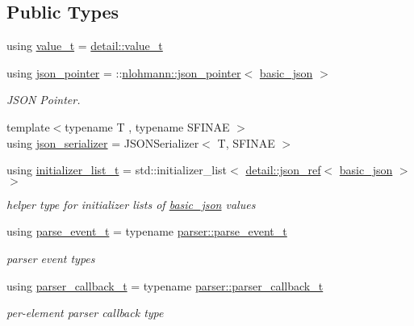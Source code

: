 \subsection*{Public Types}
\begin{DoxyCompactItemize}
\item 
using \hyperlink{classnlohmann_1_1basic__json_ae8cbef097f7da18a781fc86587de6b90}{value\+\_\+t} = \hyperlink{namespacenlohmann_1_1detail_a1ed8fc6239da25abcaf681d30ace4985}{detail\+::value\+\_\+t}
\item 
using \hyperlink{classnlohmann_1_1basic__json_a6886a5001f5b449ad316101a311ce536}{json\+\_\+pointer} = \+::\hyperlink{classnlohmann_1_1json__pointer}{nlohmann\+::json\+\_\+pointer}$<$ \hyperlink{classnlohmann_1_1basic__json}{basic\+\_\+json} $>$
\begin{DoxyCompactList}\small\item\em J\+S\+ON Pointer. \end{DoxyCompactList}\item 
{\footnotesize template$<$typename T , typename S\+F\+I\+N\+AE $>$ }\\using \hyperlink{classnlohmann_1_1basic__json_a7768841baaaa7a21098a401c932efaff}{json\+\_\+serializer} = J\+S\+O\+N\+Serializer$<$ T, S\+F\+I\+N\+AE $>$
\item 
using \hyperlink{classnlohmann_1_1basic__json_ad70a098fbc01c53497db29d3b5b656a9}{initializer\+\_\+list\+\_\+t} = std\+::initializer\+\_\+list$<$ \hyperlink{classnlohmann_1_1detail_1_1json__ref}{detail\+::json\+\_\+ref}$<$ \hyperlink{classnlohmann_1_1basic__json}{basic\+\_\+json} $>$ $>$
\begin{DoxyCompactList}\small\item\em helper type for initializer lists of \hyperlink{classnlohmann_1_1basic__json}{basic\+\_\+json} values \end{DoxyCompactList}\item 
using \hyperlink{classnlohmann_1_1basic__json_aaceba2e4cf75fc983bb75c78c8742e65}{parse\+\_\+event\+\_\+t} = typename \hyperlink{classnlohmann_1_1detail_1_1parser_a37ac88c864dda495f72cb62776b0bebe}{parser\+::parse\+\_\+event\+\_\+t}
\begin{DoxyCompactList}\small\item\em parser event types \end{DoxyCompactList}\item 
using \hyperlink{classnlohmann_1_1basic__json_ab4f78c5f9fd25172eeec84482e03f5b7}{parser\+\_\+callback\+\_\+t} = typename \hyperlink{classnlohmann_1_1detail_1_1parser_ad250ad4f2b4af4a497e727c963162ff1}{parser\+::parser\+\_\+callback\+\_\+t}
\begin{DoxyCompactList}\small\item\em per-\/element parser callback type \end{DoxyCompactList}\end{DoxyCompactItemize}
